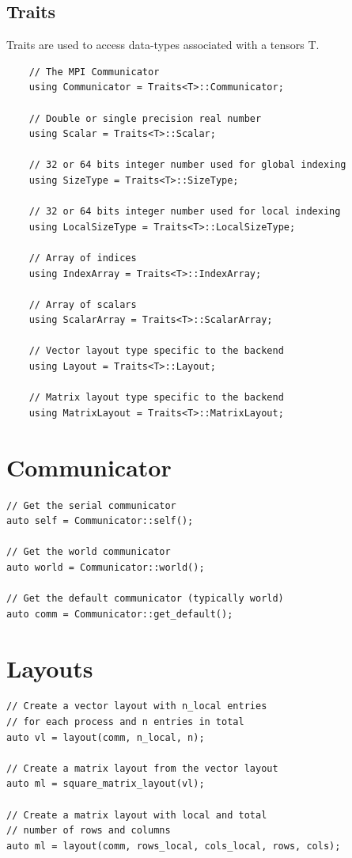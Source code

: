 \documentclass[a4paper,landscape,columns=3]{cheatsheet} %
\begin{document}
\subsection{Traits}\footnotesize
Traits are used to access data-types associated with a tensors T.
\begin{lstlisting}
    // The MPI Communicator
    using Communicator = Traits<T>::Communicator;

    // Double or single precision real number
    using Scalar = Traits<T>::Scalar;

    // 32 or 64 bits integer number used for global indexing
    using SizeType = Traits<T>::SizeType;

    // 32 or 64 bits integer number used for local indexing
    using LocalSizeType = Traits<T>::LocalSizeType;

    // Array of indices
    using IndexArray = Traits<T>::IndexArray;

    // Array of scalars
    using ScalarArray = Traits<T>::ScalarArray;

    // Vector layout type specific to the backend
    using Layout = Traits<T>::Layout;

    // Matrix layout type specific to the backend
    using MatrixLayout = Traits<T>::MatrixLayout;
\end{lstlisting}

\section{Communicator}
\begin{lstlisting}
// Get the serial communicator
auto self = Communicator::self();

// Get the world communicator
auto world = Communicator::world();

// Get the default communicator (typically world)
auto comm = Communicator::get_default();
\end{lstlisting}

\section{Layouts}

\begin{lstlisting}
// Create a vector layout with n_local entries
// for each process and n entries in total
auto vl = layout(comm, n_local, n);

// Create a matrix layout from the vector layout
auto ml = square_matrix_layout(vl);

// Create a matrix layout with local and total
// number of rows and columns
auto ml = layout(comm, rows_local, cols_local, rows, cols);
\end{lstlisting}
\end{document}

